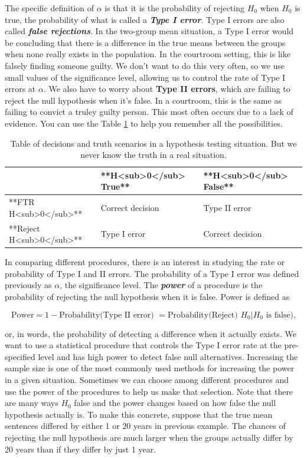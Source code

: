 \documentclass[]{book}
\begin{document}
The specific definition of \(\alpha\) is that it is the probability of
rejecting \(H_0\) when \(H_0\) is true, the probability of what is
called a \textbf{\emph{Type I error}}. Type I errors are also called
\textbf{\emph{false rejections}}. In the two-group mean situation, a
Type I error would be concluding that there is a difference in the true
means between the groups when none really exists in the population. In
the courtroom setting, this is like falsely finding someone guilty. We
don't want to do this very often, so we use small values of the
significance level, allowing us to control the rate of Type I errors at
\(\alpha\). We also have to worry about \textbf{Type II errors}, which
are failing to reject the null hypothesis when it's false. In a
courtroom, this is the same as failing to convict a truley guilty
person. This most often occurs due to a lack of evidence. You can use
the Table \ref{tab:Table2-2} to help you remember all the possibilities.




\begin{table}

\caption{\label{tab:Table2-2}Table of decisions and truth scenarios in a hypothesis
testing situation. But we never know the truth in a real situation.}
\centering
\begin{tabular}[t]{l|l|l}
\hline
 & **H<sub>0</sub> True** & **H<sub>0</sub> False**\\
\hline
**FTR H<sub>0</sub>** & Correct decision & Type II error\\
\hline
**Reject H<sub>0</sub>** & Type I error & Correct decision\\
\hline
\end{tabular}
\end{table}

In comparing different procedures, there is an interest in studying the
rate or probability of Type I and II errors. The probability of a Type I
error was defined previously as \(\alpha\), the significance level. The
\textbf{\emph{power}} of a procedure is the probability of rejecting the
null hypothesis when it is false. Power is defined as

\[\text{Power} = 1 - \text{Probability(Type II error) } = 
\text{Probability(Reject) } H_0 | H_0 \text{ is false),}\]

or, in words, the probability of detecting a difference when it actually
exists. We want to use a statistical procedure that controls the Type I
error rate at the pre-specified level and has high power to detect false
null alternatives. Increasing the sample size is one of the most
commonly used methods for increasing the power in a given situation.
Sometimes we can choose among different procedures and use the power of
the procedures to help us make that selection. Note that there are many
ways \(H_0\) false and the power changes based on how false the null
hypothesis actually is. To make this concrete, suppose that the true
mean sentences differed by either 1 or 20 years in previous example. The
chances of rejecting the null hypothesis are much larger when the groups
actually differ by 20 years than if they differ by just 1 year.
\end{document}
